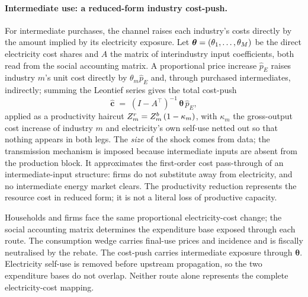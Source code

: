 \paragraph{Intermediate use: a reduced-form industry cost-push.}
For intermediate purchases, the channel raises each industry's costs directly by the
amount implied by its electricity exposure. Let
$\boldsymbol\theta=(\theta_1,\dots,\theta_{M})$ be the direct electricity cost
shares and $A$ the matrix of interindustry input coefficients, both read from the
social accounting matrix. A proportional price increase $\hat p_E$ raises industry
$m$'s unit cost directly by $\theta_m\hat p_E$ and, through purchased intermediates,
indirectly; summing the Leontief series gives the total cost-push
\begin{equation}
  \hat{\mathbf c} \;=\; (I - A^{\!\top})^{-1}\,\boldsymbol\theta\,\hat p_E ,
  \label{eq:routeB}
\end{equation}
applied as a productivity haircut $Z^{r}_m = Z^{b}_m\,(1-\kappa_m)$, with
$\kappa_m$ the gross-output cost increase of industry $m$ and electricity's own
self-use netted out so that nothing appears in both legs. The \emph{size} of the
shock comes from data; the transmission mechanism is imposed because intermediate inputs
are absent from the production block. It approximates the first-order cost pass-through
of an intermediate-input structure: firms do not substitute away from electricity, and
no intermediate energy market clears. The productivity reduction represents the resource
cost in reduced form; it is not a literal loss of productive capacity.

\begin{remark}
\label{rem:ab-contrast}
Households and firms face the same proportional electricity-cost change; the social
accounting matrix determines the expenditure base exposed through each route. The
consumption wedge carries final-use prices and incidence and is fiscally neutralised by
the rebate. The cost-push carries intermediate exposure through
$\boldsymbol\theta$. Electricity self-use is removed before upstream propagation, so
the two expenditure bases do not overlap. Neither route alone represents the complete
electricity-cost mapping.
\end{remark}

